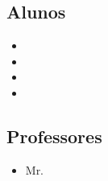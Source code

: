 
\subsection*{Alunos} %
\label{sub:alunos}
\begin{itemize}
	\item \rafael
	\item \thiago
	\item \eduardo
	\item \bruno
\end{itemize}

\subsection*{Professores} %
\label{sub:professores}

\begin{itemize}
	\item Mr. \professor
\end{itemize}
